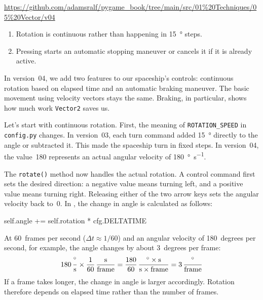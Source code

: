 \begin{diskbox}
	\url{https://github.com/adamsralf/pygame_book/tree/main/src/01%20Techniques/05%20Vector/v04}
\end{diskbox}

 
\begin{enumerate}
	\item Rotation is continuous rather than happening in \SI{15}{\degree} steps.
	\item Pressing \keys{$\downarrow$} starts an automatic stopping maneuver or cancels it if it is already active.
\end{enumerate}
\er

In version~04, we add two features to our spaceship's controls: continuous rotation based on elapsed time and an automatic braking maneuver. The basic movement using velocity vectors stays the same. Braking, in particular, shows how much work \texttt{Vector2} saves us.

Let's start with continuous rotation. First, the meaning of \texttt{ROTATION\_SPEED} in \texttt{config.py} changes. In version~03, each turn command added \SI{15}{\degree} directly to the angle or subtracted it. This made the spaceship turn in fixed steps. In version~04, the value~180 represents an actual angular velocity of \SI{180}{\degree\per\second}.

\newpage
{}

The \texttt{rotate()} method now handles the actual rotation. A control command first sets the desired direction: a negative value means turning left, and a positive value means turning right. Releasing either of the two arrow keys sets the angular velocity back to~0. In , the change in angle is calculated as follows:
\begin{codebox}
	self.angle += self.rotation * cfg.DELTATIME
\end{codebox}

At 60~frames per second ($\Delta t \approx 1/60$) and an angular velocity of 180~degrees per second, for example, the angle changes by about 3~degrees per frame:
\[
	\mysi{180}{\frac{\degree}{\second}} \times \mysi{\frac{1}{60}}{\frac{\second}{frame}} = \mysi{\frac{180}{60}}{\frac{\degree \times \second}{\second \times frame}} = \mysi{3}{\frac{\degree}{frame}}
\]
If a frame takes longer, the change in angle is larger accordingly. Rotation therefore depends on elapsed time rather than the number of frames.

